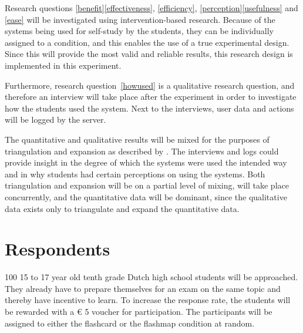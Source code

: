 \documentclass[11pt,twoside]{report} %
\begin{document}

Research questions \ref{benefit}\ref{effectiveness}, \ref{efficiency}, \ref{perception}\ref{usefulness} and \ref{ease} will be investigated using intervention-based research. Because of the systems being used for self-study by the students, they can be individually assigned to a condition, and this enables the use of a true experimental design. Since this will provide the most valid and reliable results, this research design is implemented in this experiment.

Furthermore, research question~\ref{howused} is a qualitative research question, and therefore an interview will take place after the experiment in order to investigate how the students used the system. Next to the interviews, user data and actions will be logged by the server.

The quantitative and qualitative results will be mixed for the purposes of triangulation and expansion as described by . The interviews and logs could provide insight in the degree of which the systems were used the intended way and in why students had certain perceptions on using the systems. Both triangulation and expansion will be on a partial level of mixing, will take place concurrently, and the quantitative data will be dominant, since the qualitative data exists only to triangulate and expand the quantitative data. 

\section{Respondents}



100 15 to 17 year old tenth grade Dutch high school students will be approached. They already have to prepare themselves for an exam on the same topic and thereby have incentive to learn. To increase the response rate, the students will be rewarded with a \euro{} 5 voucher for participation. The participants will be assigned to either the flashcard or the flashmap condition at random.
\end{document}
